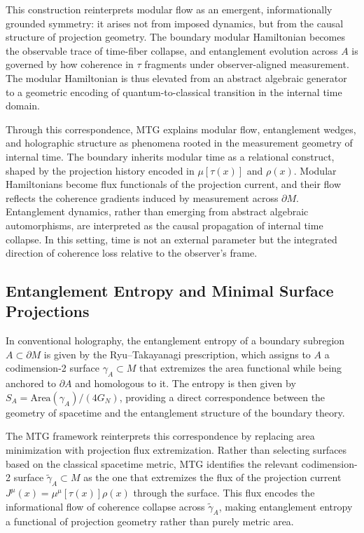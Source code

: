 \documentclass[11pt]{article}
\begin{document}
This construction reinterprets modular flow as an emergent, informationally grounded symmetry: it arises not from imposed dynamics, but from the causal structure of projection geometry. The boundary modular Hamiltonian becomes the observable trace of time-fiber collapse, and entanglement evolution across \( A \) is governed by how coherence in \( \tau \) fragments under observer-aligned measurement. The modular Hamiltonian is thus elevated from an abstract algebraic generator to a geometric encoding of quantum-to-classical transition in the internal time domain.

Through this correspondence, MTG explains modular flow, entanglement wedges, and holographic structure as phenomena rooted in the measurement geometry of internal time. The boundary inherits modular time as a relational construct, shaped by the projection history encoded in \( \mu[\tau(x)] \) and \( \rho(x) \). Modular Hamiltonians become flux functionals of the projection current, and their flow reflects the coherence gradients induced by measurement across \( \partial M \). Entanglement dynamics, rather than emerging from abstract algebraic automorphisms, are interpreted as the causal propagation of internal time collapse. In this setting, time is not an external parameter but the integrated direction of coherence loss relative to the observer's frame.
\subsection{Entanglement Entropy and Minimal Surface Projections}
In conventional holography, the entanglement entropy of a boundary subregion \( A \subset \partial M \) is given by the Ryu--Takayanagi prescription, which assigns to \( A \) a codimension-2 surface \( \gamma_A \subset M \) that extremizes the area functional while being anchored to \( \partial A \) and homologous to it. The entropy is then given by \( S_A = \mathrm{Area}(\gamma_A)/(4 G_N) \), providing a direct correspondence between the geometry of spacetime and the entanglement structure of the boundary theory.

The MTG framework reinterprets this correspondence by replacing area minimization with projection flux extremization. Rather than selecting surfaces based on the classical spacetime metric, MTG identifies the relevant codimension-2 surface \( \widetilde{\gamma}_A \subset M \) as the one that extremizes the flux of the projection current \( J^\mu(x) = \mu^\mu[\tau(x)] \rho(x) \) through the surface. This flux encodes the informational flow of coherence collapse across \( \widetilde{\gamma}_A \), making entanglement entropy a functional of projection geometry rather than purely metric area.
\end{document}
